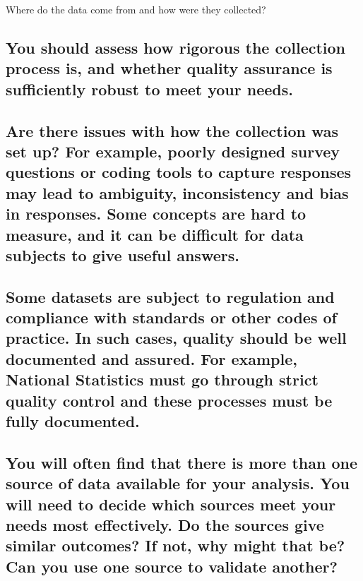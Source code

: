 \documentclass[]{book}
\begin{document}
 Where do the data come from and how were they collected?

\subsection{You should assess how rigorous the collection process is,
and whether quality assurance is sufficiently robust to meet your
needs.}\label{you-should-assess-how-rigorous-the-collection-process-is-and-whether-quality-assurance-is-sufficiently-robust-to-meet-your-needs.}

\subsection{Are there issues with how the collection was set up? For
example, poorly designed survey questions or coding tools to capture
responses may lead to ambiguity, inconsistency and bias in responses.
Some concepts are hard to measure, and it can be difficult for data
subjects to give useful
answers.}\label{are-there-issues-with-how-the-collection-was-set-up-for-example-poorly-designed-survey-questions-or-coding-tools-to-capture-responses-may-lead-to-ambiguity-inconsistency-and-bias-in-responses.-some-concepts-are-hard-to-measure-and-it-can-be-difficult-for-data-subjects-to-give-useful-answers.}

\subsection{Some datasets are subject to regulation and compliance with
standards or other codes of practice. In such cases, quality should be
well documented and assured. For example, National Statistics must go
through strict quality control and these processes must be fully
documented.}\label{some-datasets-are-subject-to-regulation-and-compliance-with-standards-or-other-codes-of-practice.-in-such-cases-quality-should-be-well-documented-and-assured.-for-example-national-statistics-must-go-through-strict-quality-control-and-these-processes-must-be-fully-documented.}

\subsection{You will often find that there is more than one source of
data available for your analysis. You will need to decide which sources
meet your needs most effectively. Do the sources give similar outcomes?
If not, why might that be? Can you use one source to validate
another?}\label{you-will-often-find-that-there-is-more-than-one-source-of-data-available-for-your-analysis.-you-will-need-to-decide-which-sources-meet-your-needs-most-effectively.-do-the-sources-give-similar-outcomes-if-not-why-might-that-be-can-you-use-one-source-to-validate-another}
\end{document}
